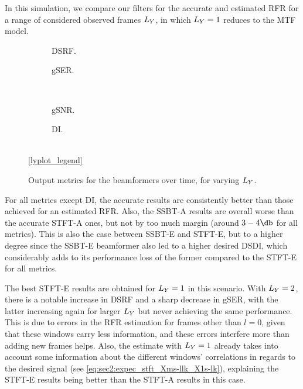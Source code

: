 In this simulation, we compare our filters for the accurate and estimated RFR for a range of considered observed frames $\Ly$, in which $\Ly = 1$ reduces to the MTF model.
\begin{figure}[!t]
	\centering
	\begin{subfigure}{0.49\textwidth}
		\centering
		
		\caption{DSRF.}
		\label{subfig:lineplot__DSRF__iSER_n15__Ly_var}
	\end{subfigure}\hfill
	\begin{subfigure}{0.49\textwidth}
		\centering
		
		\caption{gSER.}
		\label{subfig:lineplot__gSER__iSER_n15__Ly_var}
	\end{subfigure}\\[1em]
	\begin{subfigure}{0.49\textwidth}
		\centering
		
		\caption{gSNR.}
		\label{subfig:lineplot__gSNR__iSER_n15__Ly_var}
	\end{subfigure}\hfill
	\begin{subfigure}{0.49\textwidth}
		\centering
		
		\caption{DI.}
		\label{subfig:lineplot__DI__iSER_n15__Ly_var}
	\end{subfigure}\\[1em]
	\ref*{lyplot_legend}
	\caption{Output metrics for the beamformers over time, for varying $\Ly$.}
	\label{fig:lineplot__iSER_n15__Ly_var}
\end{figure}
For all metrics except DI, the accurate results are consistently better than those achieved for an estimated RFR. Also, the SSBT-A results are overall worse than the accurate STFT-A ones, but not by too much margin (around $3-4\dB$ for all metrics). This is also the case between SSBT-E and STFT-E, but to a higher degree since the SSBT-E beamformer also led to a higher desired DSDI, which considerably adds to its performance loss of the former compared to the STFT-E for all metrics.

The best STFT-E results are obtained for $\Ly = 1$ in this scenario. With $\Ly = 2$, there is a notable increase in DSRF and a sharp decrease in gSER, with the latter increasing again for larger $\Ly$ but never achieving the same performance. This is due to errors in the RFR estimation for frames other than $l = 0$, given that these windows carry less information, and these errors interfere more than adding new frames helps. Also, the estimate with $\Ly = 1$ already takes into account some information about the different windows' correlations in regards to the desired signal (see \cref{eq:sec2:expec_stft_Xms-llk_X1s-lk}), explaining the STFT-E results being better than the STFT-A results in this case.

